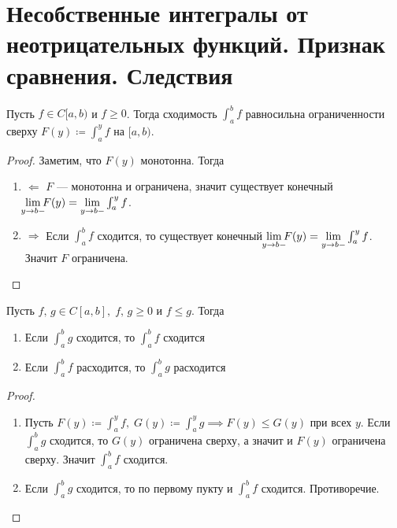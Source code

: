 \section{Несобственные интегралы от неотрицательных функций. Признак сравнения. Следствия}
\begin{theorem}
    Пусть $f \in C[a, b)$ и $f \geq 0$. Тогда сходимость $\int_{a}^{b} f$ равносильна ограниченности сверху $F(y) \coloneqq \int_{a}^{y} f$ на $[a, b)$.
  \end{theorem}
  \begin{proof}
    Заметим, что $F(y)$ монотонна. Тогда
    \begin{enumerate}
      \item[]$\boxed{\Leftarrow}$
      $F$ --- монотонна и ограничена, значит существует конечный $\lim\limits_{\mathclap{y \to b-}}F(y) = \lim\limits_{y \to b-}\int_{a}^{y} f$.
      \item[]$\boxed{\Rightarrow}$
      Если $\int_{a}^{b} f$ сходится, то существует конечный $\lim\limits_{\mathclap{y \to b-}} F(y) = \lim\limits_{y \to b-} \int_{a}^{y} f$. Значит $F$ ограничена.
    \end{enumerate}
  \end{proof}
  
  \begin{theorem}
  Пусть $f,\, g \in C[a, b], \; f,\, g \geq 0$ и $f \leq g$. Тогда
  \begin{enumerate}
      \item Если $\int_{a}^{b} g$ сходится, то $\int_{a}^{b} f$ сходится
      \item Если $\int_{a}^{b} f$ расходится, то $\int_{a}^{b} g$ расходится
  \end{enumerate}
  \end{theorem}
  \begin{proof} \quad 
    
    \begin{enumerate}
      \item Пусть $F(y) \coloneqq \int_{a}^{y} f, \; G(y) \coloneqq \int_{a}^{y} g \implies F(y) \leq G(y)$ при всех $y$. Если $\int_{a}^{b} g$ сходится, то $G(y)$ ограничена сверху, а значит и $F(y)$ ограничена сверху. Значит $\int_{a}^{b} f$ сходится.
      \item Если $\int_{a}^{b} g$ сходится, то по первому пукту и $\int_{a}^{b} f$ сходится. Противоречие.
      \end{enumerate}
  \end{proof}
  
